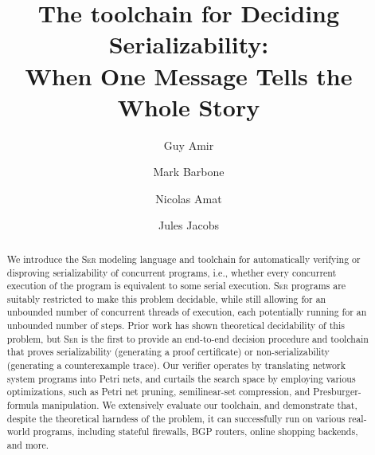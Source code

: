 \documentclass[a4paper]{llncs}
\title{The \toolname{} toolchain for Deciding Serializability:\\ When One Message Tells the Whole Story}
\author{
			Guy Amir \and
			Mark Barbone \and
			Nicolas Amat \and
			Jules Jacobs
		}
\institute{}
\newcommand{\toolname}{\textsc{Ser}}
\let\oldmaketitle\maketitle
\renewcommand{\maketitle}{
  \oldmaketitle
  \pagestyle{plain}  %
  \thispagestyle{plain}  %
}
\begin{document}
\raggedbottom


%	

\maketitle

\begin{abstract}
	We introduce the \toolname{} modeling language and toolchain for automatically verifying or disproving serializability of concurrent programs, i.e., whether every concurrent execution of the program is equivalent to some serial execution.
	\toolname{} programs are suitably restricted to make this problem decidable, while still allowing for an unbounded number of concurrent threads of execution, each potentially running for an unbounded number of steps.
	Prior work has shown theoretical decidability of this problem, but \toolname{} is the first to provide an end-to-end decision procedure and toolchain that proves serializability (generating a proof certificate) or non-serializability (generating a counterexample trace).
	Our verifier operates by translating network system programs into Petri nets, and curtails the search space by employing various optimizations, such as Petri net pruning, semilinear-set compression, and Presburger-formula manipulation.
	We extensively evaluate our toolchain, and demonstrate that, despite the theoretical harndess of the problem, it can successfully run on various real-world programs, including stateful firewalls, BGP routers, online shopping backends, and more.
\end{abstract}











\newpage

{
	
	
}

\newpage












\end{document}
